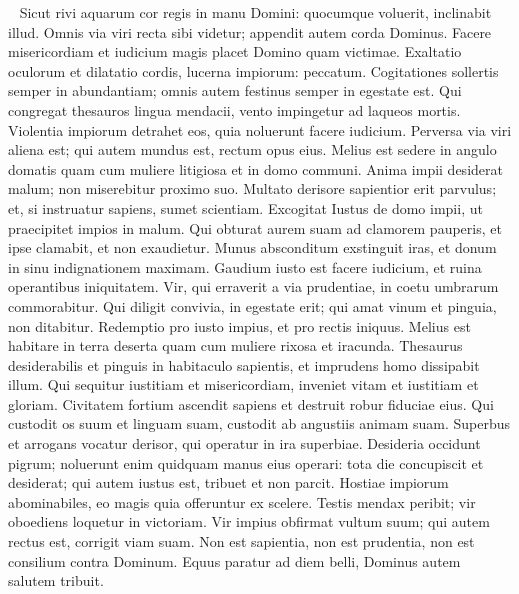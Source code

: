 \begin{biblechapter}   
\verse Sicut rivi aquarum cor regis in manu Domini: quocumque voluerit, inclinabit illud. 
\verse Omnis via viri recta sibi videtur; appendit autem corda Dominus. 
\verse Facere misericordiam et iudicium magis placet Domino quam victimae. 
\verse Exaltatio oculorum et dilatatio cordis, lucerna impiorum: peccatum. 
\verse Cogitationes sollertis semper in abundantiam; omnis autem festinus semper in egestate est. 
\verse Qui congregat thesauros lingua mendacii, vento impingetur ad laqueos mortis. 
\verse Violentia impiorum detrahet eos, quia noluerunt facere iudicium. 
\verse Perversa via viri aliena est; qui autem mundus est, rectum opus eius. 
\verse Melius est sedere in angulo domatis quam cum muliere litigiosa et in domo communi. 
\verse Anima impii desiderat malum; non miserebitur proximo suo. 
\verse Multato derisore sapientior erit parvulus; et, si instruatur sapiens, sumet scientiam. 
\verse Excogitat Iustus de domo impii, ut praecipitet impios in malum. 
\verse Qui obturat aurem suam ad clamorem pauperis, et ipse clamabit, et non exaudietur. 
\verse Munus absconditum exstinguit iras, et donum in sinu indignationem maximam. 
\verse Gaudium iusto est facere iudicium, et ruina operantibus iniquitatem. 
\verse Vir, qui erraverit a via prudentiae, in coetu umbrarum commorabitur. 
\verse Qui diligit convivia, in egestate erit; qui amat vinum et pinguia, non ditabitur. 
\verse Redemptio pro iusto impius, et pro rectis iniquus. 
\verse Melius est habitare in terra deserta quam cum muliere rixosa et iracunda. 
\verse Thesaurus desiderabilis et pinguis in habitaculo sapientis, et imprudens homo dissipabit illum. 
\verse Qui sequitur iustitiam et misericordiam, inveniet vitam et iustitiam et gloriam. 
\verse Civitatem fortium ascendit sapiens et destruit robur fiduciae eius. 
\verse Qui custodit os suum et linguam suam, custodit ab angustiis animam suam. 
\verse Superbus et arrogans vocatur derisor, qui operatur in ira superbiae. 
\verse Desideria occidunt pigrum; noluerunt enim quidquam manus eius operari: 
\verse tota die concupiscit et desiderat; qui autem iustus est, tribuet et non parcit. 
\verse Hostiae impiorum abominabiles, eo magis quia offeruntur ex scelere. 
\verse Testis mendax peribit; vir oboediens loquetur in victoriam. 
\verse Vir impius obfirmat vultum suum; qui autem rectus est, corrigit viam suam. 
\verse Non est sapientia, non est prudentia, non est consilium contra Dominum. 
\verse Equus paratur ad diem belli, Dominus autem salutem tribuit. 
\end{biblechapter}

